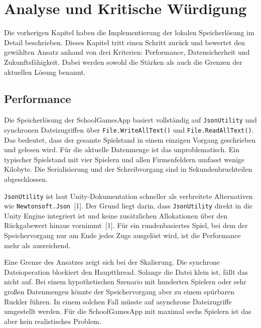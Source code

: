 \documentclass[12pt,a4paper]{article}
\begin{document}
%
%

\section{Analyse und Kritische Würdigung}

Die vorherigen Kapitel haben die Implementierung der lokalen Speicherlösung im Detail beschrieben. Dieses Kapitel tritt einen Schritt zurück und bewertet den gewählten Ansatz anhand von drei Kriterien: Performance, Datensicherheit und Zukunftsfähigkeit. Dabei werden sowohl die Stärken als auch die Grenzen der aktuellen Lösung benannt.

\subsection{Performance}

Die Speicherlösung der SchoolGamesApp basiert vollständig auf \texttt{JsonUtility} und synchronen Dateizugriffen über \texttt{File.WriteAllText()} und \texttt{File.ReadAllText()}. Das bedeutet, dass der gesamte Spielstand in einem einzigen Vorgang geschrieben und gelesen wird. Für die aktuelle Datenmenge ist das unproblematisch. Ein typischer Spielstand mit vier Spielern und allen Firmenfeldern umfasst wenige Kilobyte. Die Serialisierung und der Schreibvorgang sind in Sekundenbruchteilen abgeschlossen.

\texttt{JsonUtility} ist laut Unity-Dokumentation schneller als verbreitete Alternativen wie \texttt{Newtonsoft.Json}~[1]. Der Grund liegt darin, dass \texttt{JsonUtility} direkt in die Unity Engine integriert ist und keine zusätzlichen Allokationen über den Rückgabewert hinaus vornimmt~[1]. Für ein rundenbasiertes Spiel, bei dem der Speichervorgang nur am Ende jedes Zugs ausgelöst wird, ist die Performance mehr als ausreichend.

Eine Grenze des Ansatzes zeigt sich bei der Skalierung. Die synchrone Dateioperation blockiert den Hauptthread. Solange die Datei klein ist, fällt das nicht auf. Bei einem hypothetischen Szenario mit hunderten Spielern oder sehr großen Datenmengen könnte der Speichervorgang aber zu einem spürbaren Ruckler führen. In einem solchen Fall müsste auf asynchrone Dateizugriffe umgestellt werden. Für die SchoolGamesApp mit maximal sechs Spielern ist das aber kein realistisches Problem.
\end{document}
